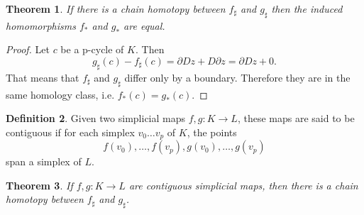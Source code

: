 \documentclass[toc=bib, headinclude]{scrartcl}
\theoremstyle{plain}
\newtheorem{theorem}{Theorem}[section]
\theoremstyle{definition}
\newtheorem	{definition}[theorem]{Definition}
\theoremstyle{remark}
\begin{document}
\begin{theorem}\label{chain_hom->invariant}%
	If there is a chain homotopy between $f_\sharp$ and $g_\sharp$ then the induced homomorphisms $f_\ast$ and $g_\ast$ are equal.
\end{theorem}

\begin{proof}
	Let $c$ be a p-cycle of $K$. Then
	\[
	g_\sharp(c)-f_\sharp(c)=\partial Dz+D\partial z=\partial Dz+0.
	\]
	That means that $f_\sharp$ and $g_\sharp$ differ only by a boundary. Therefore they are in the same homology class, i.e. $f_\ast(c)=g_\ast(c)$.
\end{proof}
\begin{definition}%
	Given two simplicial maps $f,g: K\to L$, these maps are said to be contiguous if for each simplex $v_0\dots v_p$ of $K$, the points \[
	f(v_0),\dots,f(v_p),g(v_0),\dots,g(v_p)
	\] span a simplex of $L$.
\end{definition}

\begin{theorem}\label{contiguous->chain_hom}%
	If $f,g: K\to L$ are contiguous simplicial maps, then there is a chain homotopy between $f_\sharp$ and $g_\sharp$.
\end{theorem}%
\end{document}
